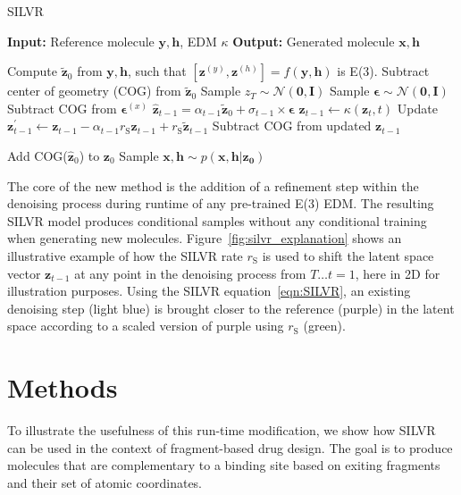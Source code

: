 \documentclass[journal=jacsat,manuscript=article]{achemso}
\begin{document}
\begin{algorithm}
\caption{SILVR}\label{alg:silvr}
\begin{algorithmic}[1]
\State \textbf{Input:} Reference molecule $\mathbf{y,h}$, EDM $\kappa$ 
\State \textbf{Output:} Generated molecule $\mathbf{x,h}$

\State Compute $\mathbf{\tilde{z}}_0$ from $\mathbf{y, h}$, such that $[\mathbf{z}^{(y)} , \mathbf{z}^{(h)} ] = f (\mathbf{y, h})$ is E(3). 
\State Subtract center of geometry (COG) from $\mathbf{\tilde{z}}_0$
\State Sample $z_T \sim \mathcal{N}(\mathbf{0,I})$
    \State Sample $\boldsymbol{\epsilon} \sim \mathcal{N}(\mathbf{0,I})$
    \State Subtract COG from $\boldsymbol{\epsilon}^{(x)}$
    \State $\mathbf{\hat{z}}_{t-1} = \alpha_{t-1} \mathbf{\tilde{z}}_{0} +\sigma_{t-1}\times\boldsymbol{\epsilon}$
    \State $\mathbf{z}_{t-1} \gets \kappa (\mathbf{z}_t,t)$
    \State Update $\mathbf{z}^{\prime}_{t-1} \gets \mathbf{z}_{t-1} - \alpha_{t-1}r_{\mathrm{S}} \mathbf{z}_{t-1} +r_{\mathrm{S}} \mathbf{\tilde{z}}_{t-1}$ 
    \State Subtract COG from updated $\mathbf{z}_{t-1}$

\EndFor
\State Add COG($\mathbf{\hat{z}}_0$) to $\mathbf{z}_0$
\State Sample $\mathbf{x,h} \sim p(\mathbf{x,h|z_0})$ 
\end{algorithmic}
\end{algorithm}



The core of the new method is the addition of a refinement step within the denoising process during runtime of any pre-trained E(3) EDM. The resulting SILVR model produces conditional samples without any conditional training when generating new molecules. Figure~\ref{fig:silvr_explanation} shows an illustrative example of how the SILVR rate $r_{\mathrm{S}}$ is used to shift the latent space vector $\mathbf{z}_{t-1}$ at any point in the denoising process from $T\ldots t=1$, here in 2D for illustration purposes. Using the SILVR equation~\ref{eqn:SILVR}, an existing denoising step (light blue) is brought closer to the reference (purple) in the latent space according to a scaled version of purple using $r_{\mathrm{S}}$ (green).

\section{Methods}
To illustrate the usefulness of this run-time modification, we show how SILVR can be used in the context of fragment-based drug design. The goal is to produce molecules that are complementary to a binding site based on exiting fragments and their set of atomic coordinates. 
\end{document}
